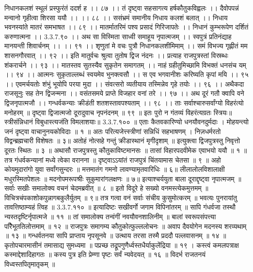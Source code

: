 निधानकलशं स्थूलं प्रस्फुरंतं ददर्श ह ।। ८७ ।।
तं दृष्ट्वा सहसागत्य हर्षकौतुकविह्वलः ।।
दैवोपपन्नं मन्वानो गृहीत्वा शिरसा ययौ ।। ।। ८८ ।।
ससंभ्रमं समानीय निधाय कलशं बलात् ।।
निधाय भवनस्यांते मातरं समभाषत ।। ८९ ।।
मातर्मातरिमं पश्य प्रसादं गिरिजापतेः ।।
निधानं कुम्भरूपेण दर्शितं करुणात्मना ।। 3.3.7.९० ।।
अथ सा विस्मिता साध्वी समाहूय नृपात्मजम् ।।
स्वपुत्रं प्रतिनंद्याह मानयन्ती शिवार्चनम् ।। ।। ९१ ।।
शृणुतां मे वचः पुत्रौ निधानकलशीमिमाम् ।।
समं विभज्य गृह्णीतं मम शासनगौरवात् ।। ९२ ।।
इति मातुर्वचः श्रुत्वा तुतोष द्विज नंदनः ।।
प्रत्याह राजपुत्रस्तां विस्रब्धः शंकरार्चने ।। ९३ ।।
मातस्तव सुतस्यैव सुकृतेन समागतम् ।।
नाहं ग्रहीतुमिच्छामि विभक्तं धनसंच यम् ।। ९४ ।।
आत्मनः सुकृताल्लब्धं स्वयमेव भुनक्त्वसौ ।।
स एव भगवानीशः करिष्यति कृपां मयि ।। ९५ ।।
एवमर्चयतोः शंभुं भूयोपि परया मुदा ।।
संवत्सरो व्यतीयाय तस्मिन्नेव गृहे तयोः ।। ९६ ।।
अथैकदा राजसूनुः सह तेन द्विजन्मना ।।
वसंतसमये प्राप्ते विजहार वनां तरे ।। ९७ ।।
अथ दूरं गतौ क्वापि वने द्विजनृपात्मजौ ।।
गन्धर्वकन्याः क्रीडंती शतशस्तावपश्यताम् ।। ९८ ।।
ताः सर्वाश्चारुसर्वांग्यो विहरंत्यो मनोहरम् ॥
दृष्ट्वा द्विजात्मजो दूरादुवाच नृपनंदनम् ॥ ९९ ॥
इतः पुरो न गंतव्यं विहरंत्यग्रतः स्त्रियः॥
स्त्रीसंन्निधानं विबुधास्त्यजंति विमलाशयाः॥ 3.3.7.१०० ॥
एताः कैतवकारिण्यो धनयौवनदुर्मदाः ।
मोहयन्त्यो जनं दृष्ट्वा वाचानुनयकोविदाः ॥ १ ॥
अतः परित्यजेत्त्स्त्रीणां सन्निधिं सहभाषणम् ।
निज़धर्मरतो विद्वन्ब्रह्मचारी विशेषतः ॥ ३॥
अतोहं नोत्सहे गन्तुं क्रीडास्थानं मृगीदृशाम् ॥
इत्युक्त्वा द्विजपुत्रस्तु निवृत्तो दूरतः स्थितः ॥ ३ ॥
अथासौ राजपुत्रस्तु कौतुकाविष्टमानसः ॥
तासां विहारपदवीमेक एवाभयो ययौ ॥ १ ॥
तत्र गंधर्वकन्यानां मध्ये त्वेका वरानना ॥
दृष्ट्वाऽऽयांतं राजपुत्रं चिंतयामास चेतसा ॥ ९ ॥
अहो कोयमुदारांगो युवा सर्वांगसुन्दरः ॥
मत्तमातंग गमनो लावण्यामृतवारिधिः ॥ ६॥
लीलालोलविशालाक्षी मधुरस्मितपेशलः ॥
मदनोपमरूपश्रीः सुकुमारांगलक्षणः ॥ ७॥
इत्याश्चर्ययुता बाला दूराद्दृष्ट्वा नृपात्मजम् ॥
सर्वाः सखीः समालोक्य वचनं चेदमब्रवीत् ॥ ८ ॥
इतो विदूरे हे सख्यो वनमस्त्येकमुत्तमम् ॥
विचित्रचंपकाशोकपुन्नागबकुलैर्युतम् ॥ ९॥
तत्र गत्वा वनं सर्वाः संचीय कुसुमोत्करम् ॥
भवत्यः पुनरायांतु तावत्तिष्ठाम्यहं त्विह ॥ 3.3.7.११० ॥
इत्यादिष्टः सखीवर्गो जगाम विपिनांतरम् ॥
सापि गंधर्वजा तस्थौ न्यस्तदृष्टिर्नृपात्मजे ॥ ११ ॥
तां समालोक्य तन्वंगीं नवयौवनशालिनीम् ॥
बालां स्वरूपसंपत्त्या परैिभूततिलोत्तमाम् ॥ १२ ॥
राजपुत्रः समागम्य कौतुकोत्फुल्ललोचनः ॥
अवाप दैवयोगेन मदनस्य शरव्यथाम् ॥ १३ ॥
गन्धर्वतनया सापि प्राप्ताय नृपसूनवे ॥
उत्थाय तरसा तस्मै प्रददौ पल्लवासनम् ॥ १४ ॥
कृतोपचारमासीनं तमासाद्य सुमध्यमा ॥
पप्रच्छ तद्रूपगुणैर्ध्वस्तधैर्याकुलेंद्रिया ॥ १९ ।
कस्त्वं कमलपत्राक्ष कस्माद्देशादिहागतः ॥
कस्य पुत्र इति प्रेम्णा पृष्टः सर्वं न्यवेदयत् ॥ १६ ॥
विदर्भ राजतनयं विध्वस्तपितृमातृकम् ॥

